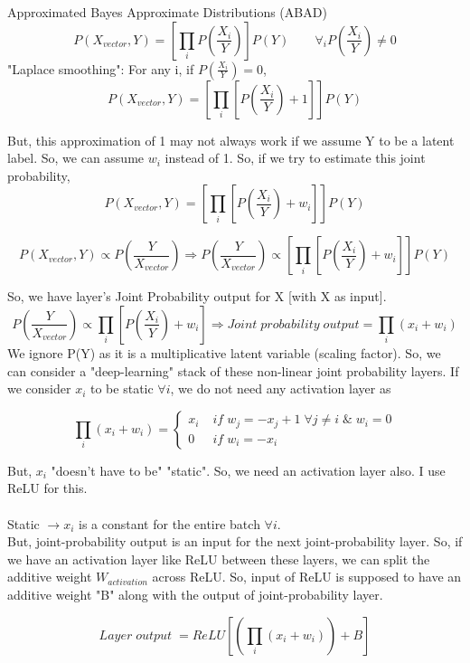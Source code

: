 \documentclass{article}
\begin{document}
	\begin{section}{Approximated Bayes Approximate Distributions (ABAD)}
		\begin{equation}
			P(X_{vector}, Y) = [\prod_i P(\frac{X_i}{Y})]P(Y) \qquad \forall_i P(\frac{X_i}{Y}) \ne 0
		\end{equation}
		"Laplace smoothing": For any i, if $P(\frac{X_i}{Y}) = 0$,
		\begin{equation}
			P(X_{vector}, Y) = [\prod_i [P(\frac{X_i}{Y}) + 1]]P(Y)
		\end{equation}

		But, this approximation of 1 may not always work if we assume Y to be a latent label. So, we can assume $w_i$ instead of 1. So, if we try to estimate this joint probability,
		\begin{equation}
			P(X_{vector}, Y) = [\prod_i [P(\frac{X_i}{Y}) + w_i]]P(Y) 
		\end{equation}
		
		\begin{equation}
			P(X_{vector}, Y) \propto P(\frac{Y}{X_{vector}}) \Rightarrow P(\frac{Y}{X_{vector}}) \propto [\prod_i [P(\frac{X_i}{Y}) + w_i]]P(Y)
		\end{equation}

		So, we have layer's Joint Probability output for X [with X as input].
		\begin{equation}
			 P(\frac{Y}{X_{vector}}) \propto \prod_i [P(\frac{X_i}{Y}) + w_i] \Rightarrow Joint \; probability \; output = \prod_i (x_i + w_i)
		\end{equation}
		We ignore P(Y) as it is a multiplicative latent variable (scaling factor). So, we can consider a "deep-learning" stack of these non-linear joint probability layers. If we consider $x_i$ to be static $\forall i$, we do not need any activation layer as 

		$$\prod_i (x_i + w_i) = \left\{
			\begin{array}{lr}
				x_i & \; if \; w_j = -x_j + 1 \;\forall j \ne i \;\&\; w_i = 0 \\
				0 & \; if \; w_i = -x_i
			\end{array}
			\right.$$ 

		But, $x_i$ "doesn't have to be" "static". So, we need an activation layer also. I use ReLU for this.\\\\
		Static $\rightarrow x_i$ is a constant for the entire batch $\forall i$.\\
		
		But, joint-probability output is an input for the next joint-probability layer. So, if we have an activation layer like ReLU between these layers, we can split the additive weight $W_{activation}$ across ReLU. So, input of ReLU is supposed to have an additive weight "B" along with the output of joint-probability layer.
		
		\begin{equation}
			Layer \; output \; = ReLU[(\prod_i(x_i + w_i)) + B]
		\end{equation}

	\end{section}
	
\end{document}
